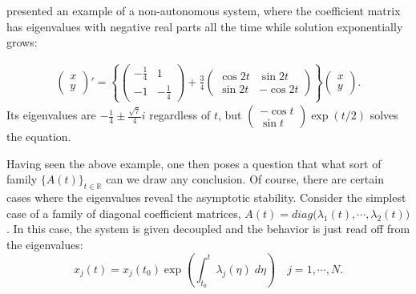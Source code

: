 \documentclass[a4paper,11pt]{article}
\theoremstyle{remark}
\begin{document}
\cite{MY60} presented an example of a non-autonomous system, where the coefficient matrix has eigenvalues with negative real parts all the time while solution exponentially grows:



\begin{align*}
 \begin{pmatrix}  x\\y \end{pmatrix}' = \left\{\begin{pmatrix}  -\frac{1}{4} & 1\\-1 & -\frac{1}{4} \end{pmatrix}+ \frac{3}{4}\begin{pmatrix} \cos 2t & \sin 2t\\ \sin 2t & -\cos 2t \end{pmatrix}\right\} \begin{pmatrix}  x\\y \end{pmatrix}.
\end{align*}
Its eigenvalues are $-\frac{1}{4} \pm \frac{\sqrt{7}}{4}i$ regardless of $t$, but $\begin{pmatrix}  -\cos t\\ \sin t \end{pmatrix}\exp(t/2)$ solves the equation.

Having seen the above example, one then poses a question that what sort of family $\{A(t)\}_{t \in \mathbb{R}}$ can we draw any conclusion. Of course, there are certain cases where the eigenvalues reveal the asymptotic stability. Consider the simplest case of a family of diagonal coefficient matrices, $A(t) = diag(\lambda_1(t), \cdots, \lambda_2(t)\big)$. In this case, the system is given decoupled  and the behavior is just read off from the eigenvalues: $$x_j(t) = x_j(t_0) \exp\left( \int_{t_0}^t \lambda_j(\eta) \;d\eta\right) \quad j=1,\cdots,N.$$
\end{document}
